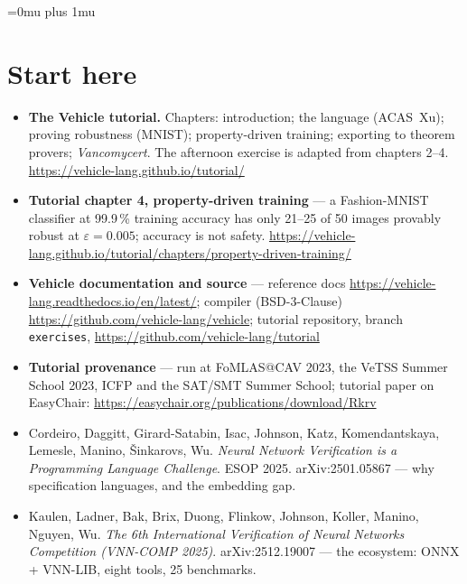 \documentclass[11pt]{article}
\begin{document}
\RaggedRight\Urlmuskip=0mu plus 1mu\relax
{}
\section*{Start here}
\begin{itemize}
  \item \textbf{The Vehicle tutorial.} Chapters: introduction; the language (ACAS~Xu); proving robustness (MNIST); property-driven training; exporting to theorem provers; \emph{Vancomycert}. The afternoon exercise is adapted from chapters 2–4. \url{https://vehicle-lang.github.io/tutorial/}
  \item \textbf{Tutorial chapter 4, property-driven training} — a Fashion-MNIST classifier at 99.9\,\% training accuracy has only 21–25 of 50 images provably robust at $\varepsilon = 0.005$; accuracy is not safety. \url{https://vehicle-lang.github.io/tutorial/chapters/property-driven-training/}
  \item \textbf{Vehicle documentation and source} — reference docs \url{https://vehicle-lang.readthedocs.io/en/latest/}; compiler (BSD-3-Clause) \url{https://github.com/vehicle-lang/vehicle}; tutorial repository, branch \texttt{exercises}, \url{https://github.com/vehicle-lang/tutorial}
  \item \textbf{Tutorial provenance} — run at FoMLAS@CAV 2023, the VeTSS Summer School 2023, ICFP and the SAT/SMT Summer School; tutorial paper on EasyChair: \url{https://easychair.org/publications/download/Rkrv}
  \item Cordeiro, Daggitt, Girard-Satabin, Isac, Johnson, Katz, Komendantskaya, Lemesle, Manino, Šinkarovs, Wu. \emph{Neural Network Verification is a Programming Language Challenge}. ESOP 2025. arXiv:2501.05867 — why specification languages, and the embedding gap.
  \item Kaulen, Ladner, Bak, Brix, Duong, Flinkow, Johnson, Koller, Manino, Nguyen, Wu. \emph{The 6th International Verification of Neural Networks Competition (VNN-COMP 2025)}. arXiv:2512.19007 — the ecosystem: ONNX + VNN-LIB, eight tools, 25 benchmarks.
\end{itemize}
\end{document}
